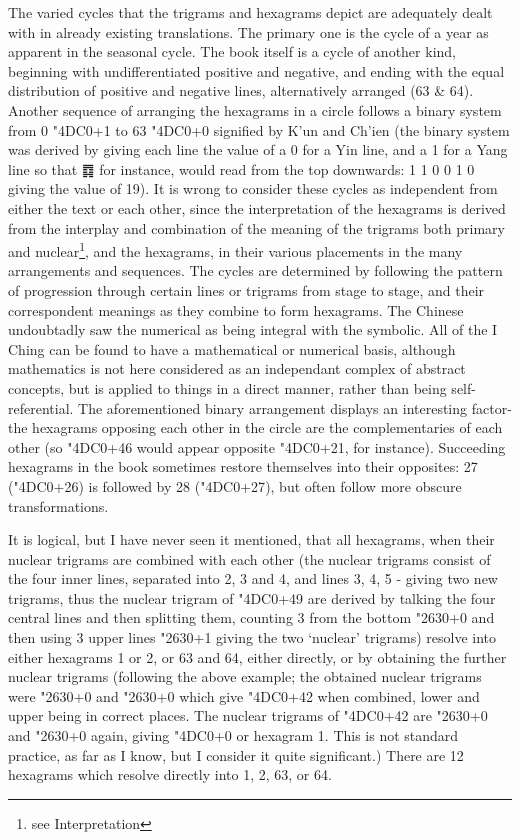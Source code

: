 \documentclass[11pt]{book}
\newcommand{\iching}[1]{{\dejavusanszh\char\numexpr"4DC0+#1}}
\newcommand{\trigram}[1]{{\dejavusans\char\numexpr"2630+#1}}
\begin{document}
The varied cycles that the trigrams and hexagrams depict are adequately dealt with in already existing translations. The primary one is the cycle of a year as apparent in the seasonal cycle. The book itself is a cycle of another kind, beginning with undifferentiated positive and negative, and ending with the equal distribution of positive and negative lines, alternatively arranged (63 \& 64). Another sequence of arranging the hexagrams in a circle follows a binary system from 0 \iching{1} to 63 \iching{0} signified by K'un and Ch'ien (the binary system was derived by giving each line the value of a 0 for a Yin line, and a 1 for a Yang line so that ䷺ for instance, would read from the top downwards: 1 1 0 0 1 0 giving the value of 19). It is wrong to consider these cycles as independent from either the text or each other, since the interpretation of the hexagrams is derived from the interplay and combination of the meaning of the trigrams both primary and nuclear\footnote{see Interpretation}, and the hexagrams, in their various placements in the many arrangements and sequences. The cycles are determined by following the pattern of progression through certain lines or trigrams from stage to stage, and their correspondent meanings as they combine to form hexagrams. The Chinese undoubtadly saw the numerical as being integral with the symbolic. All of the I Ching can be found to have a mathematical or numerical basis, although mathematics is not here considered as an independant complex of abstract concepts, but is applied to things in a direct manner, rather than being self-referential. The aforementioned binary arrangement displays an interesting factor-the hexagrams opposing each other in the circle are the complementaries of each other (so \iching{46} would appear opposite \iching{21}, for instance). Succeeding hexagrams in the book sometimes restore themselves into their opposites: 27 (\iching{26}) is followed by 28 (\iching{27}), but often follow more obscure transformations.

It is logical, but I have never seen it mentioned, that all hexagrams, when their nuclear trigrams are combined with each other (the nuclear trigrams consist of the four inner lines, separated into 2, 3 and 4, and lines 3, 4, 5 - giving two new trigrams, thus the nuclear trigram of \iching{49} are derived by talking the four central lines and then splitting them, counting 3 from the bottom \trigram{0} and then using 3 upper lines \trigram{1} giving the two `nuclear' trigrams) resolve into either hexagrams 1 or 2, or 63 and 64, either directly, or by obtaining the further nuclear trigrams (following the above example; the obtained nuclear trigrams were \trigram{0} and \trigram{0} which give \iching{42} when combined, lower and upper being in correct places. The nuclear trigrams of \iching{42} are \trigram{0} and \trigram{0} again, giving \iching{0} or hexagram 1. This is not standard practice, as far as I know, but I consider it quite significant.) There are 12 hexagrams which resolve directly into 1, 2, 63, or 64.
\end{document}
